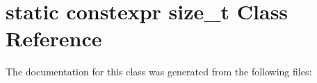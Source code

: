 \hypertarget{classstatic_01constexpr_01size__t}{}\section{static constexpr size\+\_\+t Class Reference}
\label{classstatic_01constexpr_01size__t}


The documentation for this class was generated from the following files\+:
